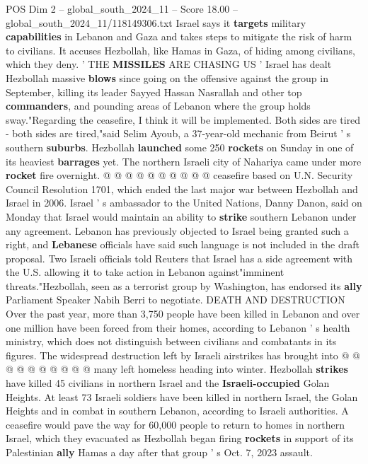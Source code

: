 \begin{textsample}{POS Dim 2 – global\_south\_2024\_11 – Score 18.00 – global\_south\_2024\_11/118149306.txt}
Israel says it \textbf{targets} military \textbf{capabilities} in Lebanon and Gaza and takes steps to mitigate the risk of harm to civilians.
It accuses Hezbollah, like Hamas in Gaza, of hiding among civilians, which they deny. ' THE \textbf{MISSILES} ARE CHASING US ' Israel has dealt Hezbollah massive \textbf{blows} since going on the offensive against the group in September, killing its leader Sayyed Hassan Nasrallah and other top \textbf{commanders}, and pounding areas of Lebanon where the group holds sway."Regarding the ceasefire, I think it will be implemented.
Both sides are tired - both sides are tired,"said Selim Ayoub, a 37-year-old mechanic from Beirut ' s southern \textbf{suburbs}.
Hezbollah \textbf{launched} some 250 \textbf{rockets} on Sunday in one of its heaviest \textbf{barrages} yet.
The northern Israeli city of Nahariya came under more \textbf{rocket} fire overnight. @ @ @ @ @ @ @ @ @ @ ceasefire based on U.N.
Security Council Resolution 1701, which ended the last major war between Hezbollah and Israel in 2006.
Israel ' s ambassador to the United Nations, Danny Danon, said on Monday that Israel would maintain an ability to \textbf{strike} southern Lebanon under any agreement.
Lebanon has previously objected to Israel being granted such a right, and \textbf{Lebanese} officials have said such language is not included in the draft proposal.
Two Israeli officials told Reuters that Israel has a side agreement with the U.S. allowing it to take action in Lebanon against"imminent threats."Hezbollah, seen as a terrorist group by Washington, has endorsed its \textbf{ally} Parliament Speaker Nabih Berri to negotiate.
DEATH AND DESTRUCTION Over the past year, more than 3,750 people have been killed in Lebanon and over one million have been forced from their homes, according to Lebanon ' s health ministry, which does not distinguish between civilians and combatants in its figures.
The widespread destruction left by Israeli airstrikes has brought into @ @ @ @ @ @ @ @ @ @ many left homeless heading into winter.
Hezbollah \textbf{strikes} have killed 45 civilians in northern Israel and the \textbf{Israeli-occupied} Golan Heights.
At least 73 Israeli soldiers have been killed in northern Israel, the Golan Heights and in combat in southern Lebanon, according to Israeli authorities.
A ceasefire would pave the way for 60,000 people to return to homes in northern Israel, which they evacuated as Hezbollah began firing \textbf{rockets} in support of its Palestinian \textbf{ally} Hamas a day after that group ' s Oct. 7, 2023 assault.

\end{textsample}
